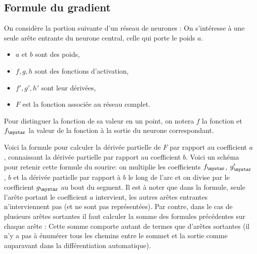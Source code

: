 \documentclass[11pt,class=report,crop=false]{standalone}
\begin{document}
\subsection{Formule du gradient}

On considère la portion suivante d'un réseau de neurones :
On s'intéresse à une seule arête entrante du neurone central, celle qui porte le poids $a$.
\begin{itemize}
  \item $a$ et $b$ sont des poids,
  \item $f, g, h$ sont des fonctions d'activation,
  \item $f', g', h'$ sont leur dérivées,
  \item $F$ est la fonction associée au réseau complet.
\end{itemize}

Pour distinguer la fonction de sa valeur en un point, on notera $f$ la fonction et $f_\mystar$ la valeur de la fonction à la sortie du neurone correspondant.

Voici la formule pour calculer la dérivée partielle de $F$ par rapport au coefficient $a$, connaissant la dérivée partielle par rapport au coefficient $b$.
Voici un schéma pour retenir cette \og{}formule du sourire\fg{}:
on multiplie les coefficients $f_\mystar$, $g'_\mystar$, $b$ et la dérivée partielle par rapport à $b$ le long de l'arc et on divise par le coefficient $g_\mystar$ au bout du segment.
Il est à noter que dans la formule, seule l'arête portant le coefficient $a$ intervient, les autres arêtes entrantes n'interviennent pas (et ne sont pas représentées). 
Par contre, dans le cas de plusieurs arêtes sortantes il faut calculer la somme 
des formules précédentes sur chaque arête :
Cette somme comporte autant de termes que d'arêtes sortantes (il n'y a pas à énumérer tous les chemins entre le sommet et la sortie comme auparavant dans la différentiation automatique).
\end{document}
